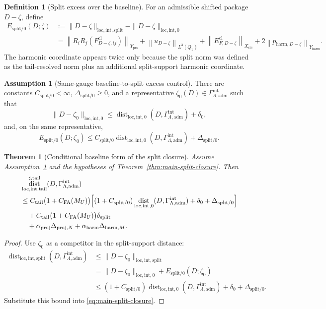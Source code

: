 \documentclass[11pt]{article}
\numberwithin{equation}{section}
\newtheorem{theorem}{Theorem}[section]
\theoremstyle{definition}
\newtheorem{definition}[definition]{Definition}
\newtheorem{assumption}[assumption]{Assumption}
\theoremstyle{remark}
\DeclareMathOperator{\dist}{dist}
\newcommand{\loc}{\mathrm{loc}}
\newcommand{\intg}{\mathrm{int}}
\newcommand{\tail}{\mathrm{tail}}
\newcommand{\spl}{\mathrm{split}}
\newcommand{\adm}{\mathrm{adm}}
\newcommand{\prs}{\mathrm{prs}}
\newcommand{\proj}{\mathrm{proj}}
\newcommand{\harm}{\mathrm{harm}}
\newcommand{\src}{\mathrm{src}}
\newcommand{\cl}{\mathrm{cl}}
\newcommand{\norm}[2]{\left\|#1\right\|_{#2}}
\newcommand{\Gammaadm}{\Gamma^{\intg}_{\Lambda,\adm}}
\begin{document}
\begin{definition}[Split excess over the baseline]\label{def:split-excess}
For an admissible shifted package $D-\zeta$, define
\begin{align*}
E_{\spl/0}(D;\zeta)
&:=
\|D-\zeta\|_{\loc,\intg,\spl}-\|D-\zeta\|_{\loc,\intg,0} \\
&=
\norm{R_iR_j(F^{\cl}_{D-\zeta,ij})}{Y_{\prs}}
+
\norm{u_{D-\zeta}}{L^3(Q_1)}
+
\norm{E^{\cl}_{F,D-\zeta}}{X_{\src}}
+2\norm{p_{\harm,D-\zeta}}{Y_{\harm}}.
\end{align*}
The harmonic coordinate appears twice only because the split norm was defined as the
tail-resolved norm plus an additional split-support harmonic coordinate.
\end{definition}

\begin{assumption}[Same-gauge baseline-to-split excess control]\label{ass:baseline-to-split}
There are constants $C_{\spl/0}<\infty$, $\Delta_{\spl/0}\ge0$, and a representative
$\zeta_0(D)\in\Gammaadm$ such that
\[
\|D-\zeta_0\|_{\loc,\intg,0}
\le
\dist_{\loc,\intg,0}(D,\Gammaadm)+\delta_0,
\]
and, on the same representative,
\[
E_{\spl/0}(D;\zeta_0)
\le
C_{\spl/0}\dist_{\loc,\intg,0}(D,\Gammaadm)+\Delta_{\spl/0}.
\]
\end{assumption}

\begin{theorem}[Conditional baseline form of the split closure]\label{thm:baseline-split-closure}
Assume Assumption~\ref{ass:baseline-to-split} and the hypotheses of Theorem~\ref{thm:main-split-closure}.
Then
\begin{align}\label{eq:baseline-split-closure}
&\dist^{\sharp,\tail}_{\loc,\intg,\tail}(D,\Gammaadm)\nonumber\\
&\le
C_{\tail}\bigl(1+C_{\mathrm{FA}}(M_U)\bigr)
\Bigl[
(1+C_{\spl/0})\dist_{\loc,\intg,0}(D,\Gammaadm)
+\delta_0+\Delta_{\spl/0}
\Bigr]
\nonumber\\
&\quad+
C_{\tail}\bigl(1+C_{\mathrm{FA}}(M_U)\bigr)\delta_{\spl}\nonumber\\
&\quad+
\alpha_{\proj}\Delta_{\proj,N}
+
\alpha_{\harm}\Delta_{\harm,M}.
\end{align}
\end{theorem}

\begin{proof}
Use $\zeta_0$ as a competitor in the split-support distance:
\begin{align*}
\dist_{\loc,\intg,\spl}(D,\Gammaadm)
&\le
\|D-\zeta_0\|_{\loc,\intg,\spl} \\
&=
\|D-\zeta_0\|_{\loc,\intg,0}+E_{\spl/0}(D;\zeta_0) \\
&\le
(1+C_{\spl/0})\dist_{\loc,\intg,0}(D,\Gammaadm)+\delta_0+\Delta_{\spl/0}.
\end{align*}
Substitute this bound into \eqref{eq:main-split-closure}.
\end{proof}
\end{document}

